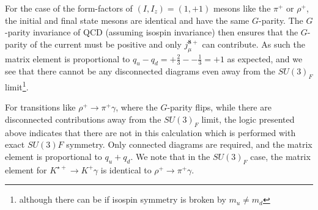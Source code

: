 \documentclass[twocolumn,amsmath,amssymb,prd,10pt,floatfix, 
superscriptaddress,nofootinbib, showpacs, preprintnumbers]{revtex4-1}
\begin{document}
For the case of the form-factors of $(I,I_z) = (1,+1)$ mesons like the $\pi^+$ or $\rho^+$, the initial and final state mesons are identical and have the same $G$-parity. The \mbox{$G$-parity} invariance of QCD (assuming isospin invariance) then ensures that the $G$-parity of the current must be positive and only $j^{\mathbf{8}+}_\mu$ can contribute. As such the matrix element is proportional to $q_u - q_d = +\tfrac{2}{3} - -\tfrac{1}{3} = +1$ as expected, and we see that there cannot be any disconnected diagrams even away from the $SU(3)_F$ limit\footnote{although there can be if isospin symmetry is broken by $m_u \neq m_d$}.


For transitions like $\rho^+ \to \pi^+ \gamma$, where the $G$-parity flips, while there are disconnected contributions away from the $SU(3)_F$ limit, the logic presented above indicates that there are not in this calculation which is performed with exact $SU(3)F$ symmetry. Only connected diagrams are required, and the matrix element is proportional to $q_u + q_d$. We note that in the $SU(3)_F$ case, the matrix element for $K^{\star+} \to K^+ \gamma$ is identical to $\rho^+ \to \pi^+ \gamma$.






















\end{document}
